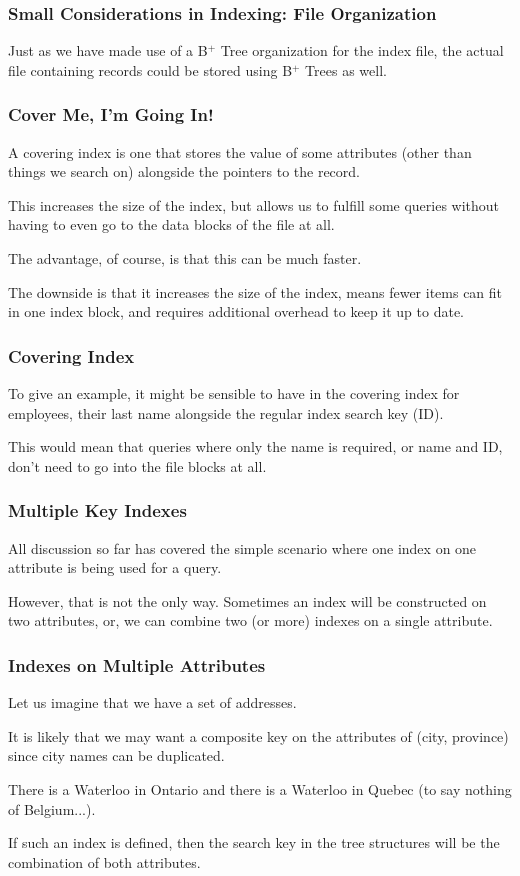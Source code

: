 \begin{frame}
\frametitle{Small Considerations in Indexing: File Organization}

Just as we have made use of a B$^{+}$ Tree organization for the index file, the actual file containing records could be stored using B$^{+}$ Trees as well.

\end{frame}


\begin{frame}
\frametitle{Cover Me, I'm Going In!}

A \alert{covering index} is one that stores the value of some attributes (other than things we search on) alongside the pointers to the record. 

This increases the size of the index, but allows us to fulfill some queries without having to even go to the data blocks of the file at all. 

The advantage, of course, is that this can be much faster. 

The downside is that it increases the size of the index, means fewer items can fit in one index block, and requires additional overhead to keep it up to date.


\end{frame}

\begin{frame}
\frametitle{Covering Index}

To give an example, it might be sensible to have in the covering index for employees, their last name alongside the regular index search key (ID). 

This would mean that queries where only the name is required, or name and ID, don't need to go into the file blocks at all.

\end{frame}

\begin{frame}
\frametitle{Multiple Key Indexes}

All discussion so far has covered the simple scenario where one index on one attribute is being used for a query. 

However, that is not the only way. Sometimes an index will be constructed on two attributes, or, we can combine two (or more) indexes on a single attribute. 


\end{frame}

\begin{frame}
\frametitle{Indexes on Multiple Attributes}

Let us imagine that we have a set of addresses. 

It is likely that we may want a composite key on the attributes of (city, province) since city names can be duplicated. 

There is a Waterloo in Ontario and there is a Waterloo in Quebec (to say nothing of Belgium...). 

If such an index is defined, then the search key in the tree structures will be the combination of both attributes. 


\end{frame}

